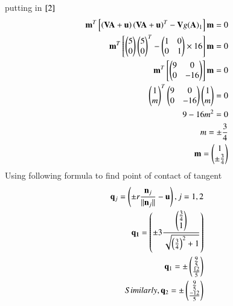 \documentclass[a5paper,10pt]{article}
\begin{document}
putting in $\eqref{2}$
\begin{align}
    \mathbf{m}^T{}\left[\left(\mathbf{V}\mathbf{A}+\mathbf{u}\right)\left(\mathbf{V}\mathbf{A}+\mathbf{u}\right)^T-\mathbf{V}g(\mathbf{A})_1\right]\mathbf{m}=0\\
    \mathbf{m}^T{}\left[\begin{pmatrix}5\\0\end{pmatrix}\begin{pmatrix}5\\0\end{pmatrix}^T-\begin{pmatrix}1&0\\0&1\end{pmatrix}\times16\right]\mathbf{m}=0\\
    \mathbf{m}^T{}\left[\begin{pmatrix}9&0\\0&-16\end{pmatrix}\right]\mathbf{m}=0\\
    \begin{pmatrix}1\\m\end{pmatrix}^T\begin{pmatrix}9&0\\0&-16\end{pmatrix}\begin{pmatrix}1\\m\end{pmatrix}=0\\
    9-16m^2=0\\
    m=\pm \frac{3}{4}\\
    \mathbf{m}=\begin{pmatrix}1\\\pm \frac{3}{4}\end{pmatrix}
\end{align}
Using following formula to find point of contact of tangent
\begin{align}
    \mathbf{q}_{j}=\left(\pm r \frac{\mathbf{n}_j}{\lVert \mathbf{n}_j \rVert} -\mathbf{u}\right), j=1,2 \label{3} \\
    \mathbf{q_1}=\left(\pm 3 \frac{\begin{pmatrix}\frac{3}{4}\\1\end{pmatrix}}{\sqrt{\left(\frac{3}{4}\right)^2+1}}\right) \\
    \mathbf{q}_1=\pm \begin{pmatrix}\frac{9}{5}\\ \frac{12}{5}\end{pmatrix}\\
    Similarly, \mathbf{q}_2=\pm\begin{pmatrix}\frac{9}{5}\\ \frac{-12}{5}\end{pmatrix}
\end{align}
\end{document}
